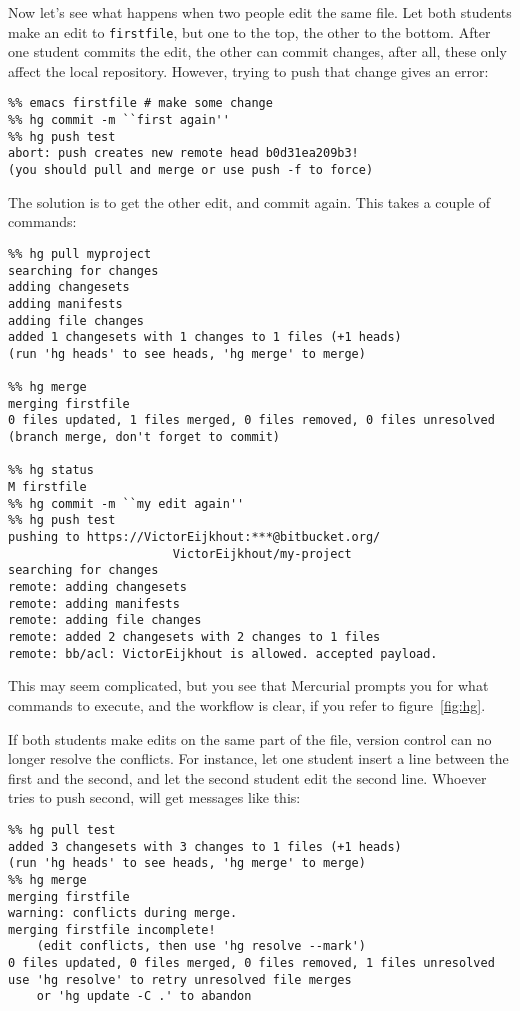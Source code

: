 Now let's see what happens when two people edit the same file.
Let both students make an edit to \verb+firstfile+, but one to the
top, the other to the bottom. After one student commits the edit, the
other can commit changes, after all, these only affect the local repository.
However, trying to push that change gives an error:
\begin{verbatim}
%% emacs firstfile # make some change
%% hg commit -m ``first again''
%% hg push test
abort: push creates new remote head b0d31ea209b3!
(you should pull and merge or use push -f to force)
\end{verbatim}
The solution is to get the other edit, and commit again. This takes a 
couple of commands:
{\small
\begin{verbatim}
%% hg pull myproject
searching for changes
adding changesets
adding manifests
adding file changes
added 1 changesets with 1 changes to 1 files (+1 heads)
(run 'hg heads' to see heads, 'hg merge' to merge)

%% hg merge
merging firstfile
0 files updated, 1 files merged, 0 files removed, 0 files unresolved
(branch merge, don't forget to commit)

%% hg status
M firstfile
%% hg commit -m ``my edit again''
%% hg push test
pushing to https://VictorEijkhout:***@bitbucket.org/
                       VictorEijkhout/my-project
searching for changes
remote: adding changesets
remote: adding manifests
remote: adding file changes
remote: added 2 changesets with 2 changes to 1 files
remote: bb/acl: VictorEijkhout is allowed. accepted payload.
\end{verbatim}
}

This may seem complicated, but you see that Mercurial prompts you 
for what commands to execute, and the workflow is clear, if you refer
to figure~\ref{fig:hg}.


If both students make edits on the same part of the file, version
control can no
longer resolve the conflicts. For instance, let one student insert a
line between the first and the second, and let the second student edit
the second line. Whoever tries to push second, will get messages
like this:
{\small
\begin{verbatim}
%% hg pull test
added 3 changesets with 3 changes to 1 files (+1 heads)
(run 'hg heads' to see heads, 'hg merge' to merge)
%% hg merge
merging firstfile
warning: conflicts during merge.
merging firstfile incomplete! 
    (edit conflicts, then use 'hg resolve --mark')
0 files updated, 0 files merged, 0 files removed, 1 files unresolved
use 'hg resolve' to retry unresolved file merges 
    or 'hg update -C .' to abandon
\end{verbatim}
}

